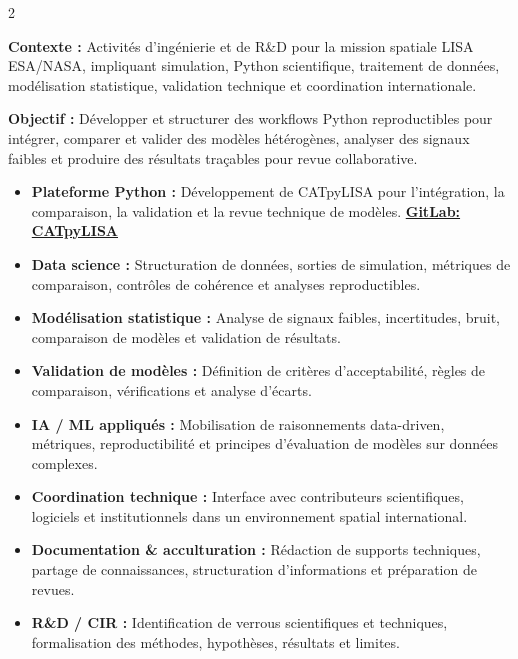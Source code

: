 \documentclass[8pt,a4paper,ragged2e,withhyper]{altacv}
\begin{document}
\begin{paracol}{2}
\divider


\textbf{Contexte :} Activités d’ingénierie et de R\&D pour la mission spatiale LISA ESA/NASA, impliquant simulation, Python scientifique, traitement de données, modélisation statistique, validation technique et coordination internationale.

\textbf{Objectif :} Développer et structurer des workflows Python reproductibles pour intégrer, comparer et valider des modèles hétérogènes, analyser des signaux faibles et produire des résultats traçables pour revue collaborative.

\begin{itemize}
  \item \textbf{Plateforme Python :} Développement de CATpyLISA pour l’intégration, la comparaison, la validation et la revue technique de modèles.
  \textcolor{DarkPastelRed}{\href{https://gitlab.oca.eu/gboileau/lisa_l3_tools}{\bf GitLab: CATpyLISA}}
  \item \textbf{Data science :} Structuration de données, sorties de simulation, métriques de comparaison, contrôles de cohérence et analyses reproductibles.
  \item \textbf{Modélisation statistique :} Analyse de signaux faibles, incertitudes, bruit, comparaison de modèles et validation de résultats.
  \item \textbf{Validation de modèles :} Définition de critères d’acceptabilité, règles de comparaison, vérifications et analyse d’écarts.
  \item \textbf{IA / ML appliqués :} Mobilisation de raisonnements data-driven, métriques, reproductibilité et principes d’évaluation de modèles sur données complexes.
  \item \textbf{Coordination technique :} Interface avec contributeurs scientifiques, logiciels et institutionnels dans un environnement spatial international.
  \item \textbf{Documentation \& acculturation :} Rédaction de supports techniques, partage de connaissances, structuration d’informations et préparation de revues.
  \item \textbf{R\&D / CIR :} Identification de verrous scientifiques et techniques, formalisation des méthodes, hypothèses, résultats et limites.
\end{itemize}

\divider


\end{paracol}
\end{document}
